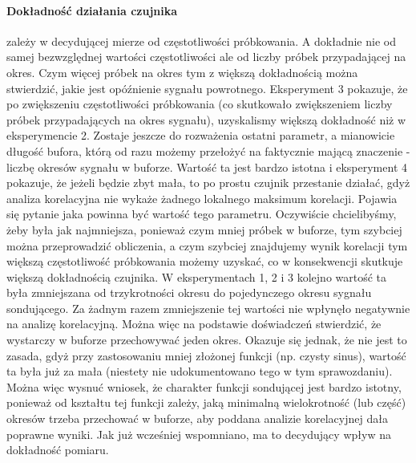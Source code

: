 \documentclass{article}
\begin{document}
{        \paragraph{Dokładność działania czujnika} zależy w decydującej mierze od
        częstotliwości próbkowania. A dokładnie nie od samej bezwzględnej wartości
        częstotliwości ale od liczby próbek przypadającej na okres. Czym więcej próbek
        na okres tym z większą dokładnością można stwierdzić, jakie jest opóźnienie
        sygnału powrotnego. Eksperyment 3 pokazuje, że po zwiększeniu częstotliwości
        próbkowania (co skutkowało zwiększeniem liczby próbek przypadających na okres
        sygnału), uzyskalismy większą dokładność niż w eksperymencie 2. Zostaje
        jeszcze do rozważenia ostatni parametr, a mianowicie długość bufora, którą od
        razu możemy przełożyć na faktycznie mającą znaczenie - liczbę okresów sygnału
        w buforze. Wartość ta jest bardzo istotna i eksperyment 4 pokazuje, że jeżeli
        będzie zbyt mała, to po prostu czujnik przestanie działać, gdyż analiza
        korelacyjna nie wykaże żadnego lokalnego maksimum korelacji. Pojawia się
        pytanie jaka powinna być wartość tego parametru. Oczywiście chcielibyśmy, żeby
        była jak najmniejsza, ponieważ czym mniej próbek w buforze, tym szybciej można
        przeprowadzić obliczenia, a czym szybciej znajdujemy wynik korelacji tym
        większą częstotliwość próbkowania możemy uzyskać, co w konsekwencji skutkuje
        większą dokładnością czujnika. W eksperymentach 1, 2 i 3 kolejno wartość ta
        była zmniejszana od trzykrotności okresu do pojedynczego okresu sygnału
        sondującego. Za żadnym razem zmniejszenie tej wartości nie wpłynęło negatywnie
        na analizę korelacyjną. Można więc na podstawie doświadczeń stwierdzić, że
        wystarczy w buforze przechowywać jeden okres. Okazuje się jednak, że nie jest
        to zasada, gdyż przy zastosowaniu mniej złożonej funkcji (np. czysty sinus),
        wartość ta była już za mała (niestety nie udokumentowano tego w tym
        sprawozdaniu). Można więc wysnuć wniosek, że charakter funkcji sondującej
        jest bardzo istotny, ponieważ od kształtu tej funkcji zależy, jaką minimalną
        wielokrotność (lub część) okresów trzeba przechować w buforze, aby poddana
        analizie korelacyjnej dała poprawne wyniki. Jak już wcześniej wspomniano, ma
        to decydujący wpływ na dokładność pomiaru.
    }
\end{document}
